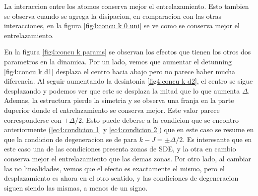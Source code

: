 La interaccion entre los atomos conserva mejor el entrelazamiento. Esto tambien se observa cuando se agrega la disipacion, en comparacion con las otras interacciones, en la figura \ref{fig4:concu k 0 uni} se ve como se conserva mejor el entrelazamiento.

En la figura \ref{fig4:concu k params} se observan los efectos que tienen los otros dos parametros en la dinamica. Por un lado, vemos que aumentar el detunning \ref{fig4:concu k d1} desplaza el centro hacia abajo pero no parece haber mucha diferencia. Al seguir aumentando la desintonia \ref{fig4:concu k d2}, el centro se sigue desplazando y podemos ver que este se desplaza la mitad que lo que aumenta $\Delta$. Ademas, la estructura pierde la simetria y se observa una franja en la parte duperior donde el entrelazamiento se conserva mejor. Este valor parece corresponderse con $+\Delta/2$. Esto puede deberse a la condicion que se encontro anteriormente (\ref{ec4:condicion 1} y \ref{ec4:condicion 2}) que en este caso se resume en que la condicion de degeneracion se de para $k-J=\pm\Delta/2$. Es interesante que en este caso una de las condiciones presenta zonas de SDE, y la otra en cambio conserva mejor el entrelazamiento que las demas zonas. Por otro lado, al cambiar las no linealidades, vemos que el efecto es exactamente el mismo, pero el desplazamiento es ahora en el otro sentido, y las condiciones de degeneracion siguen siendo las mismas, a menos de un signo.
